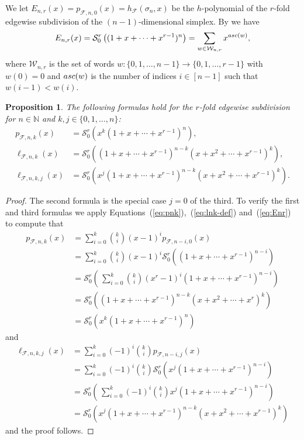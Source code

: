 \documentclass[11pt]{amsart}
\newtheorem{proposition}[theorem]{Proposition}
\newcommand{\asc}{{\rm asc}}
\newcommand{\fF}{{\mathcal F}}
\newcommand{\sS}{{\mathcal S}}
\newcommand{\wW}{{\mathcal W}}
\newcommand{\NN}{{\mathbb N}}
\renewcommand{\to}{\rightarrow}
\begin{document}
We let $E_{n,r}(x) = p_{\fF,n,0}(x) = h_\fF(\sigma_n,
x)$ be the $h$-polynomial of the $r$-fold edgewise 
subdivision of the $(n-1)$-dimensional simplex. By 
\cite[Equation~(8)]{Ath16b} we have
%
\begin{equation} 
E_{n,r}(x) = \sS^r_0 \left( (1 + x + \cdots 
                             + x^{r-1})^n \right) 
           = \sum_{w \in \wW_{n,r}} x^{\asc(w)},
\label{eq:Enr} 
\end{equation}
%
where $\wW_{n,r}$ is the set of words $w: \{0, 
1,\dots,n-1\} \to \{0, 1,\dots,r-1\}$ with $w(0) = 0$ 
and $\asc(w)$ is the number of indices $i \in [n-1]$ 
such that $w(i-1) < w(i)$.

\begin{proposition} \label{prop:esdr} 
The following formulas hold for the $r$-fold 
edgewise subdivision for $n \in \NN$ and $k, j \in
\{0, 1,\dots,n\}$:
%
\begin{align*} 
p_{\fF,n,k}(x) & = \sS^r_0 
   \left( x^k (1 + x + \cdots + x^{r-1})^n 
	 \right), \\ 
\ell_{\fF,n,k}(x) & = \sS^r_0 \left( 
      (1 + x + \cdots + x^{r-1})^{n-k} 
			(x + x^2 + \cdots + x^{r-1})^k \right), \\    
\ell_{\fF,n,k,j}(x) & = \sS^r_0 \left( x^j
      (1 + x + \cdots + x^{r-1})^{n-k} 
			(x + x^2 + \cdots + x^{r-1})^k \right).			
\end{align*}
% 
\end{proposition}

\begin{proof}
The second formula is the special case $j=0$ of 
the third. To verify the first and third formulas
we apply Equations~(\ref{eq:pnk}),~(\ref{eq:lnk-def}) 
and~(\ref{eq:Enr}) to compute that 
%
\begin{align*} 
p_{\fF,n,k}(x) & = \sum_{i=0}^k {k \choose i} 
   (x-1)^i p_{\fF,n-i,0}(x) \\ & = 
\sum_{i=0}^k {k \choose i} (x-1)^i \sS^r_0 \left( 
(1 + x + \cdots + x^{r-1})^{n-i} \right) \\ 
    & = \sS^r_0 \left( \, \sum_{i=0}^k {k \choose i} 
(x^r-1)^i (1 + x + \cdots + x^{r-1})^{n-i} 
                     \right) \\ & = \sS^r_0 
\left( (1 + x + \cdots + x^{r-1})^{n-k} 
			(x + x^2 + \cdots + x^r)^k \right) \\ & =
\sS^r_0 \left( x^k 
      (1 + x + \cdots + x^{r-1})^n \right)
\end{align*}
% 
and
%
\begin{align*} 
\ell_{\fF,n,k,j}(x) & = \sum_{i=0}^k (-1)^i 
      {k \choose i} p_{\fF,n-i,j}(x) \\ & = 
\sum_{i=0}^k (-1)^i {k \choose i} \sS^r_0 \left( 
x^j (1 + x + \cdots + x^{r-1})^{n-i} \right) 
    \\ & = \sS^r_0 \left( \, \sum_{i=0}^k (-1)^i 
           {k \choose i} 
x^j (1 + x + \cdots + x^{r-1})^{n-i} \right) 
    \\ & = \sS^r_0 \left( x^j 
		       (1 + x + \cdots + x^{r-1})^{n-k} 
			     (x + x^2 + \cdots + x^{r-1})^k \right)
\end{align*}
%
and the proof follows.
\end{proof}
\end{document}

